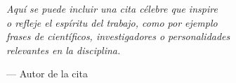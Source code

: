 

\cleardoublepage
\thispagestyle{empty}
\vspace*{0.3\textheight}

\begin{flushright}
  \itshape
  Aquí se puede incluir una cita célebre que inspire\\
  o refleje el espíritu del trabajo, como por ejemplo\\
  frases de científicos, investigadores o personalidades\\
  relevantes en la disciplina.

  \vspace{0.5cm}
  \upshape\small --- Autor de la cita
\end{flushright}
